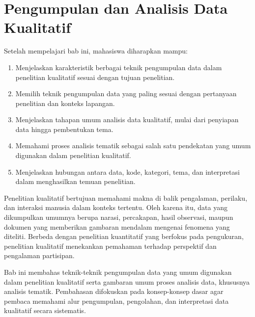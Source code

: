 \documentclass[
  indonesian,
  letterpaper,
  DIV=11,
  numbers=noendperiod]{scrreprt}
\providecommand{\tightlist}{%
  \setlength{\itemsep}{0pt}\setlength{\parskip}{0pt}}
\begin{document}
\chapter{Pengumpulan dan Analisis Data
Kualitatif}\label{pengumpulan-dan-analisis-data-kualitatif}

\begin{tcolorbox}[enhanced jigsaw, colframe=quarto-callout-note-color-frame, toptitle=1mm, breakable, leftrule=.75mm, arc=.35mm, toprule=.15mm, colback=white, colbacktitle=quarto-callout-note-color!10!white, bottomtitle=1mm, bottomrule=.15mm, titlerule=0mm, title=\textcolor{quarto-callout-note-color}{\faInfo}\hspace{0.5em}{Capaian Pembelajaran}, coltitle=black, left=2mm, opacitybacktitle=0.6, opacityback=0, rightrule=.15mm]

Setelah mempelajari bab ini, mahasiswa diharapkan mampu:

\begin{enumerate}
\def\labelenumi{\arabic{enumi}.}
\tightlist
\item
  Menjelaskan karakteristik berbagai teknik pengumpulan data dalam
  penelitian kualitatif sesuai dengan tujuan penelitian.
\item
  Memilih teknik pengumpulan data yang paling sesuai dengan pertanyaan
  penelitian dan konteks lapangan.
\item
  Menjelaskan tahapan umum analisis data kualitatif, mulai dari
  penyiapan data hingga pembentukan tema.
\item
  Memahami proses analisis tematik sebagai salah satu pendekatan yang
  umum digunakan dalam penelitian kualitatif.
\item
  Menjelaskan hubungan antara data, kode, kategori, tema, dan
  interpretasi dalam menghasilkan temuan penelitian.
\end{enumerate}

\end{tcolorbox}

Penelitian kualitatif bertujuan memahami makna di balik pengalaman,
perilaku, dan interaksi manusia dalam konteks tertentu. Oleh karena itu,
data yang dikumpulkan umumnya berupa narasi, percakapan, hasil
observasi, maupun dokumen yang memberikan gambaran mendalam mengenai
fenomena yang diteliti. Berbeda dengan penelitian kuantitatif yang
berfokus pada pengukuran, penelitian kualitatif menekankan pemahaman
terhadap perspektif dan pengalaman partisipan.

Bab ini membahas teknik-teknik pengumpulan data yang umum digunakan
dalam penelitian kualitatif serta gambaran umum proses analisis data,
khususnya analisis tematik. Pembahasan difokuskan pada konsep-konsep
dasar agar pembaca memahami alur pengumpulan, pengolahan, dan
interpretasi data kualitatif secara sistematis.
\end{document}
